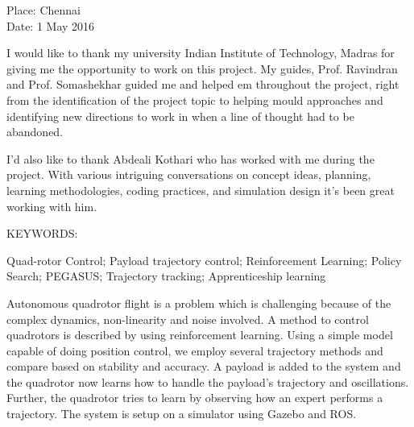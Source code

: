\documentclass[hidelinks,BTech]{iitmdiss}
\begin{document}
\vspace*{0.25in}
\noindent Place: Chennai\\
Date: 1 May 2016


\acknowledgements

I would like to thank my university Indian Institute of Technology, Madras for giving me the opportunity to work on this project. My guides, Prof. Ravindran and Prof. Somashekhar guided me and helped em throughout the project, right from the identification of the project topic to helping mould approaches and identifying new directions to work in when a line of thought had to be abandoned.

I'd also like to thank Abdeali Kothari who has worked with me during the project. With various intriguing conversations on concept ideas, planning, learning methodologies, coding practices, and simulation design it's been great working with him. 


\abstract

\noindent KEYWORDS: \hspace*{0.5em} \parbox[t]{4.4in}{Quad-rotor Control; Payload  trajectory control; Reinforcement Learning; Policy Search; PEGASUS; Trajectory tracking; Apprenticeship learning }

\vspace*{24pt}

\noindent Autonomous quadrotor flight is a problem which is challenging because of the complex dynamics, non-linearity and noise involved. A method to control quadrotors is described by using reinforcement learning. Using a simple model capable of doing position control, we employ several trajectory methods and compare based on stability and accuracy. A payload is added to the system and the quadrotor now learns how to handle the payload's trajectory and oscillations. Further, the quadrotor tries to learn by observing how an expert performs a trajectory. The system is setup on a simulator using Gazebo and ROS.

\pagebreak


\begin{singlespace}
\clearpage
{}
{}
\tableofcontents


\listoffigures
{}
\end{singlespace}
\end{document}
